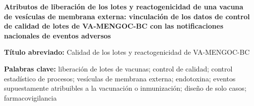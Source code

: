 \documentclass[11pt]{article}
\begin{document}
\begin{titlepage}
\SyntheticNotice
\begin{center}
{\LARGE\bfseries Atributos de liberación de los lotes y reactogenicidad de una vacuna de vesículas
de membrana externa: vinculación de los datos de control de calidad de \PTNLots{} lotes de
VA-MENGOC-BC con las notificaciones nacionales de eventos adversos\par}
\bigskip
\AuthorBlock
\end{center}
\bigskip
\noindent\textbf{Título abreviado:} Calidad de los lotes y reactogenicidad de VA-MENGOC-BC\par
\noindent\textbf{Palabras clave:} liberación de lotes de vacunas; control de calidad; control
estadístico de procesos; vesículas de membrana externa; endotoxina; eventos supuestamente
atribuibles a la vacunación o inmunización; diseño de solo casos; farmacovigilancia\par
\end{titlepage}

\linenumbers
\end{document}
